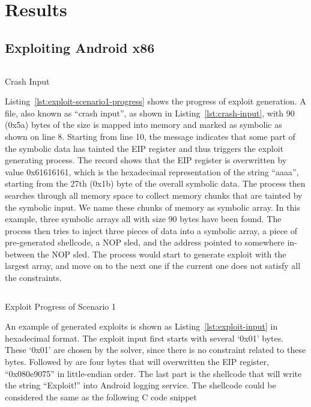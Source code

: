 \chapter{Results}

\section{Exploiting Android x86}

\begin{listing}[H]
  \singlespacing
  \inputminted[]{text}{source/crash-input}
  \caption{Crash Input}
  \label{lst:crash-input}
  \onehalfspacing
\end{listing}

Listing~\ref{lst:exploit-scenario1-progress} shows the progress of exploit
generation. A file, also known as ``crash input'', as shown in
Listing~\ref{lst:crash-input}, with 90 (0x5a) bytes of the size is mapped into
memory and marked as symbolic as shown on line 8. Starting from line 10, the
message indicates that some part of the symbolic data has tainted the EIP
register and thus triggers the exploit generating process. The record shows
that the EIP register is overwritten by value 0x61616161, which is the
hexadecimal representation of the string ``aaaa'', starting from the 27th
(0x1b) byte of the overall symbolic data.  The process then searches through
all memory space to collect memory chunks that are tainted by the symbolic
input. We name these chunks of memory as symbolic array. In this example, three
symbolic arrays all with size 90 bytes have been found. The process then tries
to inject three pieces of data into a symbolic array, a piece of pre-generated
shellcode, a NOP sled, and the address pointed to somewhere in-between the NOP
sled. The process would start to generate exploit with the largest array, and
move on to the next one if the current one does not satisfy all the
constraints.

\begin{listing}[H]
  \singlespacing
  \inputminted[fontsize=\footnotesize, linenos]{text}{source/exploit-scenario1-progress}
  \caption{Exploit Progress of Scenario 1}
  \label{lst:exploit-scenario1-progress}
  \onehalfspacing
\end{listing}

An example of generated exploits is shown as Listing~\ref{lst:exploit-input} in
hexadecimal format. The exploit input first starts with several `0x01' bytes.
These `0x01' are chosen by the solver, since there is no constraint related to
these bytes. Followed by are four bytes that will overwritten the EIP register,
``0x080e9075'' in little-endian order. The last part is the shellcode that will
write the string ``Exploit!'' into Android logging service. The shellcode could
be considered the same as the following C code snippet

